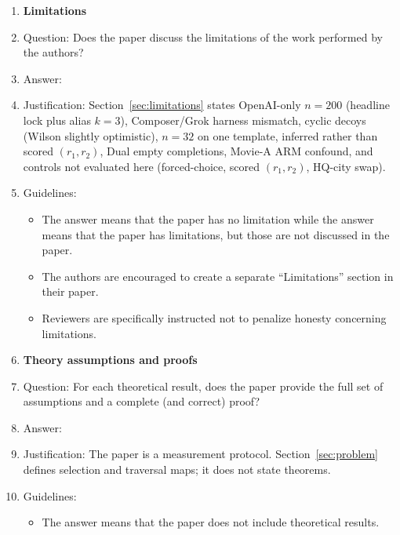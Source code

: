 \begin{enumerate}
\item {\bf Limitations}
\item[] Question: Does the paper discuss the limitations of the work performed by the authors?
\item[] Answer: \answerYes{}
\item[] Justification: Section~\ref{sec:limitations} states OpenAI-only $n{=}200$ (headline lock plus alias $k{=}3$), Composer/Grok harness mismatch, cyclic decoys (Wilson slightly optimistic), $n{=}32$ on one template, inferred rather than scored $(r_1,r_2)$, Dual empty completions, Movie-A ARM confound, and controls not evaluated here (forced-choice, scored $(r_1,r_2)$, HQ-city swap).
\item[] Guidelines:
\begin{itemize}
\item The answer \answerNA{} means that the paper has no limitation while the answer \answerNo{} means that the paper has limitations, but those are not discussed in the paper.
\item The authors are encouraged to create a separate ``Limitations'' section in their paper.
\item Reviewers are specifically instructed not to penalize honesty concerning limitations.
\end{itemize}

\item {\bf Theory assumptions and proofs}
\item[] Question: For each theoretical result, does the paper provide the full set of assumptions and a complete (and correct) proof?
\item[] Answer: \answerNA{}
\item[] Justification: The paper is a measurement protocol. Section~\ref{sec:problem} defines selection and traversal maps; it does not state theorems.
\item[] Guidelines:
\begin{itemize}
\item The answer \answerNA{} means that the paper does not include theoretical results.
\end{itemize}


\end{enumerate}
